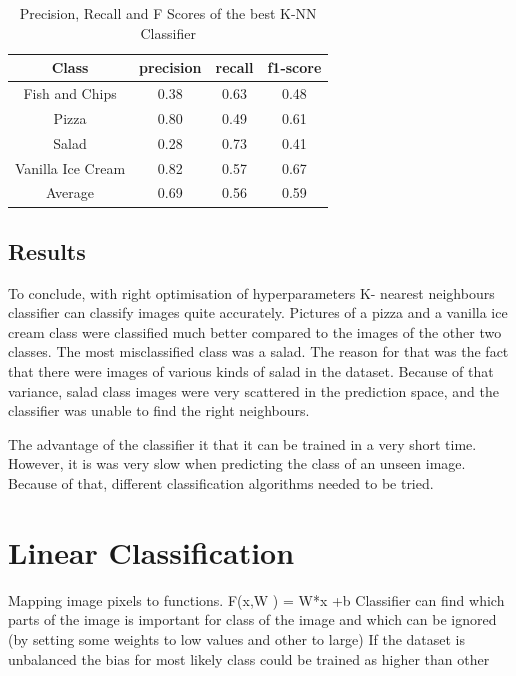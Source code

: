 \begin{table}[h!]
\begin{center}
\begin{tabular}{ |c|c|c|c| } 
 \hline
 Class & precision &   recall & f1-score  \\ \hline
 Fish and Chips    &   0.38   &   0.63  &    0.48   \\
            Pizza   &    0.80  &    0.49 &     0.61 \\
            Salad    &   0.28  &    0.73  &    0.41  \\
Vanilla Ice Cream     &  0.82  &    0.57   &   0.67   \\ \hline
     Average     &  0.69   &   0.56    &  0.59  \\
 \hline
\end{tabular}
\caption{Precision, Recall and F Scores of the best K-NN Classifier}
\label{table:1}
\end{center}
\end{table}


   

\subsection{Results}

To conclude, with right optimisation of hyperparameters K- nearest neighbours classifier can classify images quite accurately. Pictures of a pizza and a vanilla ice cream class were classified much better compared to the images of the other two classes. The most misclassified class was a salad. The reason for that was the fact that there were images of various kinds of salad in the dataset. Because of that variance, salad class images were very scattered in the prediction space, and the classifier was unable to find the right neighbours.

The advantage of the classifier it that it can be trained in a very short time. However, it is was very slow when predicting the class of an unseen image. Because of that, different classification algorithms needed to be tried.
\iffalse
\section{Linear Classification}

Mapping image pixels to functions. 
F(x,W ) = W*x +b
Classifier can find which parts of the image is important for class of the image and which can be ignored (by setting some weights to low values and other to large)
If the dataset is unbalanced the bias for most likely class could be trained as higher than other

